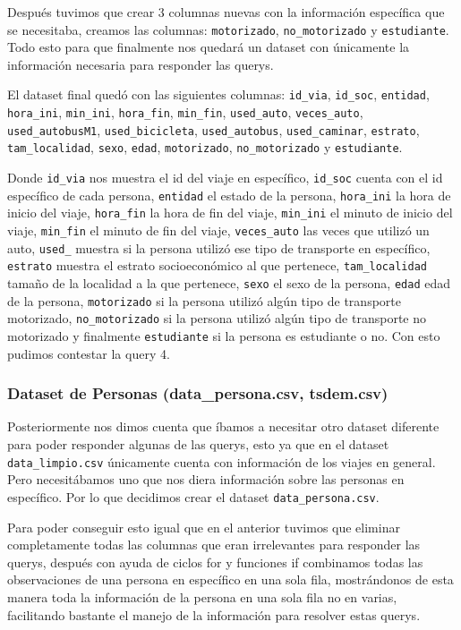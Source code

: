 \documentclass[12pt,a4paper]{article}
\begin{document}
Después tuvimos que crear 3 columnas nuevas con la información específica que se necesitaba, creamos las columnas: \texttt{motorizado}, \texttt{no\_motorizado} y \texttt{estudiante}. Todo esto para que finalmente nos quedará un dataset con únicamente la información necesaria para responder las querys. 

El dataset final quedó con las siguientes columnas: \texttt{id\_via}, \texttt{id\_soc}, \texttt{entidad}, \texttt{hora\_ini}, \texttt{min\_ini}, \texttt{hora\_fin}, \texttt{min\_fin}, \texttt{used\_auto}, \texttt{veces\_auto}, \texttt{used\_autobusM1}, \texttt{used\_bicicleta}, \texttt{used\_autobus}, \texttt{used\_caminar}, \texttt{estrato}, \texttt{tam\_localidad}, \texttt{sexo}, \texttt{edad}, \texttt{motorizado}, \texttt{no\_motorizado} y \texttt{estudiante}.

Donde \texttt{id\_via} nos muestra el id del viaje en específico, \texttt{id\_soc} cuenta con el id específico de cada persona, \texttt{entidad} el estado de la persona, \texttt{hora\_ini} la hora de inicio del viaje, \texttt{hora\_fin} la hora de fin del viaje, \texttt{min\_ini} el minuto de inicio del viaje, \texttt{min\_fin} el minuto de fin del viaje, \texttt{veces\_auto} las veces que utilizó un auto, \texttt{used\_} muestra si la persona utilizó ese tipo de transporte en específico, \texttt{estrato} muestra el estrato socioeconómico al que pertenece, \texttt{tam\_localidad} tamaño de la localidad a la que pertenece, \texttt{sexo} el sexo de la persona, \texttt{edad} edad de la persona, \texttt{motorizado} si la persona utilizó algún tipo de transporte motorizado, \texttt{no\_motorizado} si la persona utilizó algún tipo de transporte no motorizado y finalmente \texttt{estudiante} si la persona es estudiante o no. Con esto pudimos contestar la query 4.

\subsubsection{Dataset de Personas (data\_persona.csv, tsdem.csv)}

Posteriormente nos dimos cuenta que íbamos a necesitar otro dataset diferente para poder responder algunas de las querys, esto ya que en el dataset \texttt{data\_limpio.csv} únicamente cuenta con información de los viajes en general. Pero necesitábamos uno que nos diera información sobre las personas en específico. Por lo que decidimos crear el dataset \texttt{data\_persona.csv}.

Para poder conseguir esto igual que en el anterior tuvimos que eliminar completamente todas las columnas que eran irrelevantes para responder las querys, después con ayuda de ciclos for y funciones if combinamos todas las observaciones de una persona en específico en una sola fila, mostrándonos de esta manera toda la información de la persona en una sola fila no en varias, facilitando bastante el manejo de la información para resolver estas querys. 
\end{document}
